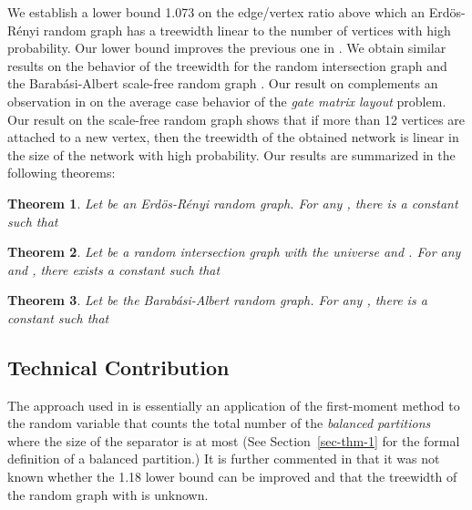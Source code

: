 \documentclass[11pt]{article}
\newtheorem{theorem}{Theorem}
\begin{document}
We establish a lower bound  1.073 on the edge/vertex ratio  
above which an Erd\"{o}s-R\'{e}nyi random graph  has a treewidth 
linear to the number of vertices with high probability. Our lower bound
improves the previous one  in \cite{kloks94}. 
We obtain similar results on the behavior of the treewidth 
for the random intersection graph  and the  Barab\'{a}si-Albert scale-free random graph . Our result on  complements an observation in \cite{karonski99cpc} on the average case behavior of the \textit{gate matrix layout} problem. 
Our result on the scale-free random graph  shows that if more than 12 vertices are attached to a new vertex, then the treewidth of the obtained network is linear in the size of the network with high probability.             
Our results are summarized in the following theorems: 
 
\begin{theorem}
\label{thm-treewidth-bound}
Let  be an Erd\"{o}s-R\'{e}nyi random graph. 
For any , there is a constant
 such that

\end{theorem}


\begin{theorem}
\label{thm-intersection-graph}
Let  be a random intersection graph with the universe 
 and . 
For any  and , there exists a constant  such that
  
\end{theorem}

\begin{theorem}
\label{thm-power-law-graph}
Let  be the Barab\'{a}si-Albert random graph. For any , there is 
a constant  such that    

\end{theorem}


\subsection{Technical Contribution}
The approach used in \cite{kloks94} is essentially an application of 
the first-moment method
to the random variable that counts the total number of the \textit{balanced partitions}
 where the size of the separator  is at most  
(See Section~\ref{sec-thm-1} for the formal definition of a balanced partition.)  It is further commented in \cite{kloks94} that it was not known whether the 1.18 lower bound 
can be improved and that the treewidth of the random graph  with 
 is unknown. 
\end{document}
